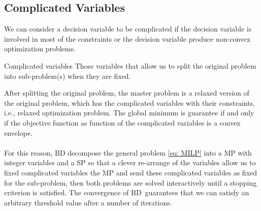 \subsection{Complicated Variables}
We can consider a decision variable to be complicated if the decision variable is involved in most of the constraints or the decision variable produce non-convex optimization problems. 
\begin{definition}{Complicated variables}{}
Those variables that allow us to split the original problem into sub-problem(s) when they are fixed. 
\end{definition}
After splitting the original problem, the master problem is a relaxed version of the original problem, which has the complicated variables with their constraints, i.e., relaxed optimization problem. The global minimum is guarantee if and only if the objective function as function of the complicated variables is a convex envelope.\\\\
For this reason, BD decompose the general problem \eqref{eq: MILP} into a MP with integer variables and a SP so that a clever re-arrange of the variables allow us to fixed complicated variables the MP and send these complicated variables as fixed for the sub-problem, then both problems are solved interactively until a stopping criterion is satisfied. The convergence of BD\,\cite{Sahinidis1991BDConvergence} guarantees that we can satisfy an arbitrary threshold value after a number of iterations. 

